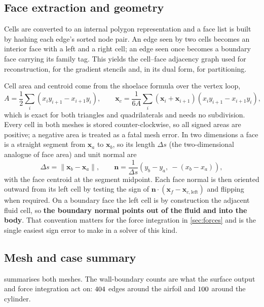 \subsection{Face extraction and geometry}

Cells are converted to an internal polygon representation and a face list is
built by hashing each edge's sorted node pair. An edge seen by two cells becomes
an interior face with a left and a right cell; an edge seen once becomes a
boundary face carrying its family tag. This yields the cell--face adjacency
graph used for reconstruction, for the gradient stencils and, in its dual form,
for partitioning.

Cell area and centroid come from the shoelace formula over the vertex loop,
\begin{equation}
  A=\frac12\sum_i \left(x_i y_{i+1}-x_{i+1}y_i\right),\qquad
  \mathbf{x}_c=\frac{1}{6A}\sum_i (\mathbf{x}_i+\mathbf{x}_{i+1})
  \left(x_i y_{i+1}-x_{i+1}y_i\right),
  \label{eq:shoelace}
\end{equation}
which is exact for both triangles and quadrilaterals and needs no subdivision.
Every cell in both meshes is stored counter-clockwise, so all signed areas are
positive; a negative area is treated as a fatal mesh error. In two dimensions a
face is a straight segment from $\mathbf{x}_a$ to $\mathbf{x}_b$, so its length
$\Delta s$ (the two-dimensional analogue of face area) and unit normal are
\begin{equation}
  \Delta s=\|\mathbf{x}_b-\mathbf{x}_a\|,\qquad
  \mathbf{n}=\frac{1}{\Delta s}\left(y_b-y_a,\ -(x_b-x_a)\right),
\end{equation}
with the face centroid at the segment midpoint. Each face normal is then
oriented outward from its left cell by testing the sign of
$\mathbf{n}\cdot(\mathbf{x}_f-\mathbf{x}_{c,\mathrm{left}})$ and flipping when
required. On a boundary face the left cell is by construction the adjacent fluid
cell, so \textbf{the boundary normal points out of the fluid and into the body}.
That convention matters for the force integration in \cref{sec:forces} and is
the single easiest sign error to make in a solver of this kind.

\subsection{Mesh and case summary}

 summarises both meshes. The wall-boundary counts are what the
surface output and force integration act on: $404$ edges around the
airfoil and $100$ around the cylinder.

